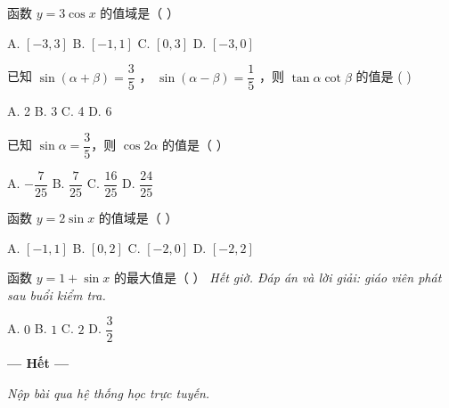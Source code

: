 \documentclass[11pt, a4paper]{article}
\begin{document}
\begin{baitap}[20]
函数 $y = 3\cos x$ 的值域是（ ）
\par\vspace{3pt}
\noindent A. $[-3,3]$ \quad B. $[-1,1]$ \quad C. $[0,3]$ \quad D. $[-3,0]$
\end{baitap}

\begin{baitap}[21]
已知 $\sin(\alpha + \beta) = \dfrac{3}{5}$ ， $\sin(\alpha - \beta) = \dfrac{1}{5}$ ，则 $\tan\alpha \cot\beta$ 的值是 ( )
\par\vspace{3pt}
\noindent A. 2 \quad B. 3 \quad C. 4 \quad D. 6
\end{baitap}

\begin{baitap}[22]
已知 $\sin\alpha = \dfrac{3}{5}$，则 $\cos 2\alpha$ 的值是（ ）
\par\vspace{3pt}
\noindent A. $-\dfrac{7}{25}$ \quad B. $\dfrac{7}{25}$ \quad C. $\dfrac{16}{25}$ \quad D. $\dfrac{24}{25}$
\end{baitap}

\begin{baitap}[23]
函数 $y = 2\sin x$ 的值域是（ ）
\par\vspace{3pt}
\noindent A. $[-1,1]$ \quad B. $[0,2]$ \quad C. $[-2,0]$ \quad D. $[-2,2]$
\end{baitap}

\begin{baitap}[24]
函数 $y = 1 + \sin x$ 的最大值是（ ） \emph{Hết giờ. Đáp án và lời giải: giáo viên phát sau buổi kiểm tra.}
\par\vspace{3pt}
\noindent A. $0$ \quad B. $1$ \quad C. $2$ \quad D. $\dfrac{3}{2}$
\end{baitap}

\vspace{0.5cm}
\begin{center}
\textbf{--- Hết ---}
\end{center}

\vspace{0.3cm}
\noindent\emph{Nộp bài qua hệ thống học trực tuyến.}
\end{document}
